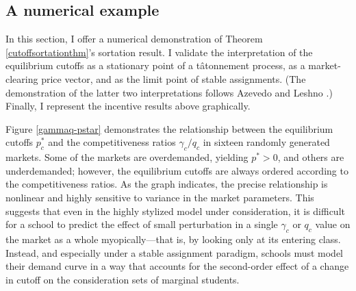 \documentclass[12pt]{article}
\numberwithin{equation}{subsection}
\theoremstyle{definition}
\begin{document}
\subsection{A numerical example}
In this section, I offer a numerical demonstration of Theorem \ref{cutoffsortationthm}'s sortation result. I validate the interpretation of the equilibrium cutoffs as a stationary point of a t\^{a}tonnement process, as a market-clearing price vector, and as the limit point of stable assignments. (The demonstration of the latter two interpretations follows Azevedo and Leshno \parencite*{supplydemandfw}.) Finally, I represent the incentive results above graphically.

Figure \ref{gammaq-pstar} demonstrates the relationship between the equilibrium cutoffs $p_c^*$ and the competitiveness ratios $\gamma_c / q_c$ in sixteen randomly generated markets. Some of the markets are overdemanded, yielding $p^* > 0$, and others are underdemanded; however, the equilibrium cutoffs are always ordered according to the competitiveness ratios. As the graph indicates, the precise relationship is nonlinear and highly sensitive to variance in the market parameters. This suggests that even in the highly stylized model under consideration, it is difficult for a school to predict the effect of small perturbation in a single $\gamma_c$ or $q_c$ value on the market as a whole myopically---that is, by looking only at its entering class. Instead, and especially under a stable assignment paradigm, schools must model their demand curve in a way that accounts for the second-order effect of a change in cutoff on the consideration sets of marginal students.
\end{document}
